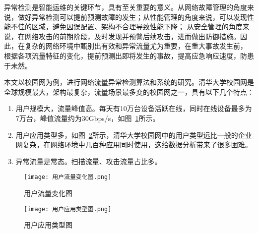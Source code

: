 异常检测是智能运维的关键环节，具有至关重要的意义。从网络故障管理的角度来说，做好异常检测可以提前预测故障的发生；从性能管理的角度来说，可以发现性能不佳的区域，避免因误配置、架构不合理导致性能下降；
从安全管理的角度来说，在网络攻击的前期阶段，及时发现并预警后续攻击，进而做出防御措施。因此，在复杂的网络环境中甄别出有效和异常流量尤为重要，在重大事故发生前，
根据各项流量特征的变化，提前预测出即将发生的事故，提高应急响应速度，防患于未然。


本文以校园网为例，进行网络流量异常检测算法和系统的研究。清华大学校园网是全球规模最大，架构最复杂，流量场景最多变的校园网之一，具有以下几个特点：
\begin{enumerate}
    \item 用户规模大，流量峰值高。每天有10万台设备活跃在线，同时在线设备最多为7万台，峰值流量约为30Gbps/s，如图~\ref{fig:用户流量变化图}所示。
    \item	用户应用类型多，如图~\ref{fig:用户应用类型图}所示，清华大学校园网中的用户类型远比一般的企业网复杂，在网络环境中几百种应用同时使用，这给数据分析带来了很多困难。
    \item	异常流量是常态。扫描流量、攻击流量占比多。
\end{enumerate}

\begin{figure}
  \centering
  \texttt{[image: 用户流量变化图.png]}
  \caption{用户流量变化图}
  \label{fig:用户流量变化图}
\end{figure}

\begin{figure}
  \centering
  \texttt{[image: 用户应用类型图.png]}
  \caption{用户应用类型图}
  \label{fig:用户应用类型图}
\end{figure}



